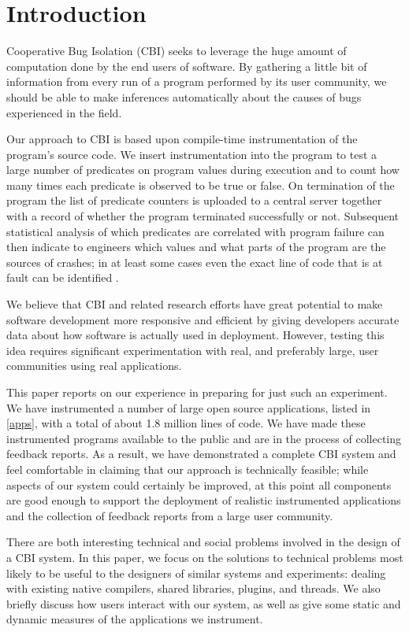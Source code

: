 \documentclass[10pt,twocolumn]{article}
\begin{document}
\section{Introduction}

Cooperative Bug Isolation (CBI) seeks to leverage the
huge amount of computation done by the end users of software.  By
gathering a little bit of information from every run of a
program performed by its user community, we should be able to make
inferences automatically about the causes of bugs experienced in the field.

Our approach to CBI is based upon compile-time instrumentation of the
program's source code.  We insert instrumentation into the program to
test a large number of predicates on program values during
execution and to count how many times each predicate is observed to be
true or false.  On termination of the program the list of predicate
counters is uploaded to a central server together with a record of
whether the program terminated successfully or not.  Subsequent
statistical analysis of which predicates are correlated with program
failure can then indicate to engineers which values and what parts of
the program are the sources of crashes; in at least some cases even
the exact line of code that is at fault can be identified \cite{PLDI`03*141,Liblit:2003:SUEBI,Zheng:2003:SDSP}.

We believe that CBI and related research efforts have great potential
to make software development more responsive and efficient by giving
developers accurate data about how software is actually used in
deployment.  However, testing this idea requires significant
experimentation with real, and preferably large, user communities
using real applications.

This paper reports on our experience in preparing for just such an
experiment.  We have instrumented a number of large open source
applications, listed in \autoref{apps}, with a total of about 1.8
million lines of code. We have made these instrumented programs
available to the public and are in the process of collecting feedback
reports.  As a result, we have demonstrated a complete CBI system and
feel comfortable in claiming that our approach is technically
feasible; while aspects of our system could certainly be improved, at
this point all components are good enough to support the deployment of
realistic instrumented applications and the collection of feedback
reports from a large user community.

There are both interesting technical and social problems involved in
the design of a CBI system.  In this paper, we focus on the solutions
to technical problems most likely to be useful to the designers of
similar systems and experiments: dealing with existing native
compilers, shared libraries,
plugins, and threads.  We also briefly discuss how users interact with
our system, as well as give some static and dynamic measures of the
applications we instrument.
\end{document}
